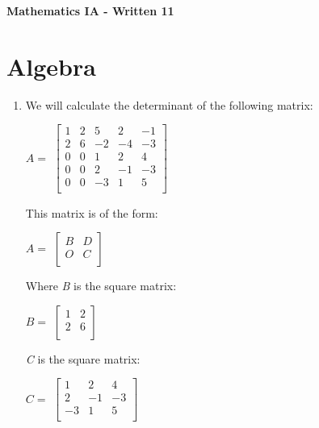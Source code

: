 \documentclass{article}
\begin{document}
\pagestyle{fancy}
\fancyhf{} %


\begin{center}
  \Large\textbf{Mathematics IA - Written 11}\\
\end{center}
\section*{\fontsize{12}{15}\selectfont Algebra}
\begin{enumerate}[label=(\alph*)]
  \item We will calculate the determinant of the following matrix:
  \begin{center}
  \(A =\) $\begin{bmatrix}
    1 & 2 & 5 & 2 & -1 \\
    2 & 6 & -2 & -4 & -3 \\
    0 & 0 & 1 & 2 & 4 \\
    0 & 0 & 2 & -1 & -3 \\
    0 & 0 & -3 & 1 & 5 \\
  \end{bmatrix}$
\end{center}
This matrix is of the form:
\begin{center}
  \(A =\) $\begin{bmatrix}
  B & D \\
  O & C \\
  \end{bmatrix}$
\end{center}
Where \textit{B} is the square matrix:
\begin{center}
  \(B =\) $\begin{bmatrix}
  1 & 2 \\
  2 & 6 \\
  \end{bmatrix}$
\end{center}
\textit{C} is the square matrix:
\begin{center}
  \(C =\) $\begin{bmatrix}
  1 & 2 & 4 \\
  2 & -1 & -3 \\
  -3 & 1 & 5 \\
  \end{bmatrix}$

\end{center}
\end{enumerate}
\end{document}
